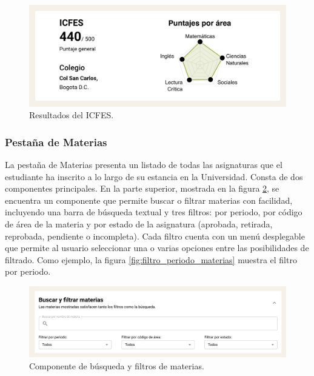 \begin{figure}[H]
	\includegraphics[width=\textwidth]{assets/nes/icfes.png}
	\caption{Resultados del ICFES.}
	\label{fig:icfes}
\end{figure}

\subsubsection{Pestaña de Materias}

La pestaña de Materias presenta un listado de todas las asignaturas que el estudiante ha inscrito a lo largo de su estancia en la Universidad. Consta de dos componentes principales. En la parte superior, mostrada en la figura \ref{fig:filtros_materias}, se encuentra un componente que permite buscar o filtrar materias con facilidad, incluyendo una barra de búsqueda textual y tres filtros: por periodo, por código de área de la materia y por estado de la asignatura (aprobada, retirada, reprobada, pendiente o incompleta). Cada filtro cuenta con un menú desplegable que permite al usuario seleccionar una o varias opciones entre las posibilidades de filtrado. Como ejemplo, la figura \ref{fig:filtro_periodo_materias} muestra el filtro por periodo.

\begin{figure}[H]
	\includegraphics[width=\textwidth]{assets/nes/filtros_materias.png}
	\caption{Componente de búsqueda y filtros de materias.}
	\label{fig:filtros_materias}
\end{figure}

